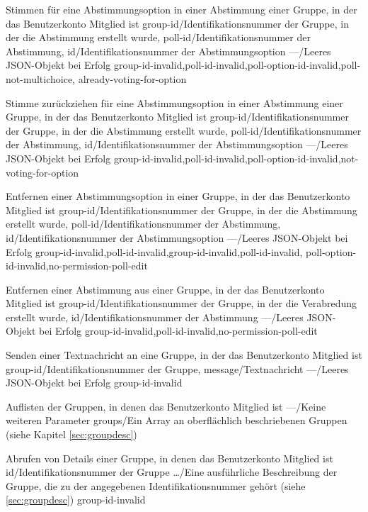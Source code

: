 \documentclass[parskip=full,11pt]{scrartcl}
\begin{document}
{Stimmen für eine Abstimmungsoption in einer Abstimmung einer Gruppe,
in der das Benutzerkonto Mitglied ist}
{group-id/Identifikationsnummer der Gruppe{,} in der die Abstimmung erstellt
wurde,
poll-id/Identifikationsnummer der Abstimmung,
id/Identifikationsnummer der Abstimmungsoption}
{---/Leeres JSON-Objekt bei Erfolg}
{group-id-invalid,poll-id-invalid,poll-option-id-invalid,poll-not-multichoice,
already-voting-for-option}

{Stimme zurückziehen für eine Abstimmungsoption in einer Abstimmung
einer Gruppe, in der das Benutzerkonto Mitglied ist}
{group-id/Identifikationsnummer der Gruppe{,} in der die Abstimmung erstellt
wurde,
poll-id/Identifikationsnummer der Abstimmung,
id/Identifikationsnummer der Abstimmungsoption}
{---/Leeres JSON-Objekt bei Erfolg}
{group-id-invalid,poll-id-invalid,poll-option-id-invalid,not-voting-for-option}

{Entfernen einer Abstimmungsoption in einer Gruppe, in der das Benutzerkonto
Mitglied ist}
{group-id/Identifikationsnummer der Gruppe{,} in der die Abstimmung erstellt
wurde,
poll-id/Identifikationsnummer der Abstimmung,
id/Identifikationsnummer der Abstimmungsoption}
{---/Leeres JSON-Objekt bei Erfolg}
{group-id-invalid,poll-id-invalid,group-id-invalid,poll-id-invalid,
poll-option-id-invalid,no-permission-poll-edit}

{Entfernen einer Abstimmung aus einer Gruppe, in der das Benutzerkonto Mitglied
ist}
{group-id/Identifikationsnummer der Gruppe{,} in der die Verabredung erstellt
wurde,
id/Identifikationsnummer der Abstimmung}
{---/Leeres JSON-Objekt bei Erfolg}
{group-id-invalid,poll-id-invalid,no-permission-poll-edit}

{Senden einer Textnachricht an eine Gruppe, in der das Benutzerkonto Mitglied
ist}
{group-id/Identifikationsnummer der Gruppe,
message/Textnachricht} %
{---/Leeres JSON-Objekt bei Erfolg}
{group-id-invalid}

{Auflisten der Gruppen, in denen das Benutzerkonto Mitglied ist}
{---/Keine weiteren Parameter}
{groups/Ein Array an oberflächlich beschriebenen Gruppen (siehe
Kapitel \ref{sec:groupdesc})}
{}

{Abrufen von Details einer Gruppe, in denen das Benutzerkonto Mitglied ist}
{id/Identifikationsnummer der Gruppe}
{\dots/Eine ausführliche Beschreibung der Gruppe{,} die zu der angegebenen
Identifikationsnummer gehört (siehe \ref{sec:groupdesc})}
{group-id-invalid}
\end{document}

